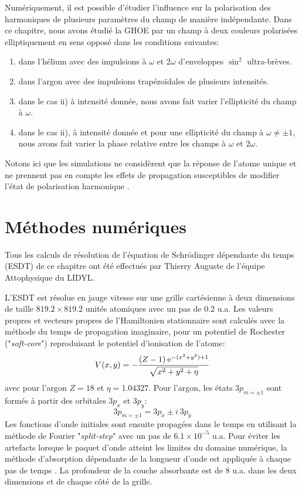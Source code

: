 Numériquement, il est possible d'étudier l'influence sur la polarisation des harmoniques de plusieurs paramètres du champ de manière indépendante. Dans ce chapitre, nous avons étudié la GHOE par un champ à deux couleurs polarisées elliptiquement en sens opposé dans les conditions suivantes:
\begin{enumerate}[label=\roman*)]
\item dans l'hélium avec des impulsions à $\omega$ et 2$\omega$ d'enveloppes $\sin^2$ ultra-brèves.
\item dans l'argon avec des impulsions trapézoïdales de plusieurs intensités.
\item dans le cas ii) à intensité donnée, nous avons fait varier l'ellipticité du champ à $\omega$.
\item dans le cas ii), à intensité donnée et pour une ellipticité du champ à $\omega \neq \pm 1$, nous avons fait varier la phase relative entre les champs à $\omega$ et 2$\omega$.
\end{enumerate}
Notons ici que les simulations ne considèrent que la réponse de l'atome unique et ne prennent pas en compte les effets de propagation susceptibles de modifier l'état de polarisation harmonique .

\section{Méthodes numériques}
\label{sec:MethodesNum}
Tous les calculs de résolution de l'équation de Schrödinger dépendante du temps (ESDT) de ce chapitre ont été effectués par Thierry Auguste de l'équipe Attophysique du LIDYL. 

L'ESDT est résolue en jauge vitesse sur une grille cartésienne à deux dimensions de taille $819.2 \times 819.2$ unités atomiques avec un pas de 0.2 u.a. Les valeurs propres et vecteurs propres de l'Hamiltonien stationnaire sont calculés avec la méthode du temps de propagation imaginaire, pour un potentiel de Rochester ("\textit{soft-core}") reproduisant le potentiel d'ionisation de l'atome:
\begin{equation}
V(x,y) = - \frac{(Z-1) \: \mathrm{e}^{-(x^2+y^2) + 1}}{\sqrt{x^2 + y^2 + \eta}}
\end{equation}
avec pour l'argon $Z = 18$ et $\eta = 1.04327$. Pour l'argon, les états $3p_{m=\pm 1}$ sont formés à partir des orbitales $3p_x$ et $3p_y$:
\begin{equation}
3p_{m=\pm 1} = 3p_x \pm i \: 3p_y
\end{equation}
Les fonctions d'onde initiales sont ensuite propagées dans le temps en utilisant la méthode de Fourier "\textit{split-step}"  avec un pas de $6.1 \times 10^{-5}$ u.a. Pour éviter les artefacts lorsque le paquet d'onde atteint les limites du domaine numérique, la méthode d'absorption dépendante de la longueur d'onde est appliquée à chaque pas de temps . La profondeur de la couche absorbante est de 8 u.a. dans les deux dimensions et de chaque côté de la grille.

